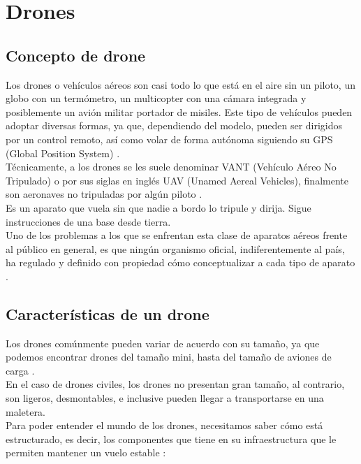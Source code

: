 %

\section{Drones}

%
\subsection{Concepto de drone}

Los drones o vehículos aéreos son casi todo lo que está en el aire sin un 
piloto, un globo con un termómetro, un multicopter con una cámara integrada y 
posiblemente un avión militar portador de misiles. Este tipo de vehículos pueden 
adoptar diversas formas, ya que, dependiendo del modelo, pueden ser dirigidos 
por un control remoto, así como volar de forma autónoma siguiendo su GPS (Global 
Position System) \cite{drone_nombre_cosa}. \\
Técnicamente, a los drones se les suele denominar VANT (Vehículo Aéreo No 
Tripulado) o por sus siglas en inglés UAV (Unamed Aereal Vehicles), finalmente 
son aeronaves no tripuladas por algún piloto 
\cite{app_veh_no_tripulados_hidr, drone_nombre_cosa}. \\
Es un aparato que vuela sin que nadie a bordo lo tripule y dirija. Sigue 
instrucciones de una base desde tierra. \\
Uno de los problemas a los que se enfrentan esta clase de aparatos aéreos frente 
al público en general, es que ningún organismo oficial, indiferentemente al 
país, ha regulado y definido con propiedad cómo conceptualizar a cada tipo de 
aparato \cite{drone_nombre_cosa}.

%
\subsection{Características de un drone}

Los drones comúnmente pueden variar de acuerdo con su tamaño, ya que podemos 
encontrar drones del tamaño mini, hasta del tamaño de aviones de carga 
\cite{fisica_quadcoptero}. \\
En el caso de drones civiles, los drones no presentan gran tamaño, al contrario, 
son ligeros, desmontables, e inclusive pueden llegar a transportarse en una 
maletera. \\
Para poder entender el mundo de los drones, necesitamos saber cómo está 
estructurado, es decir, los componentes que tiene en su infraestructura que le 
permiten mantener un vuelo estable \cite{fisica_quadcoptero}:

